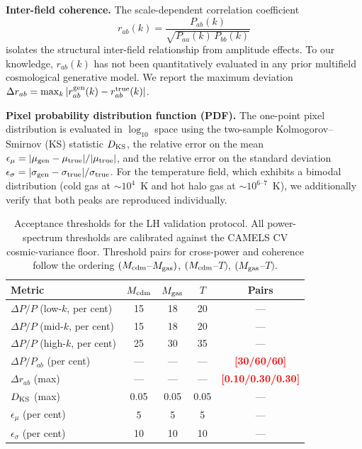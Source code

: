 \documentclass[usenatbib]{mnras}
\newcommand{\FILL}[1]{\textcolor{red}{\textbf{[#1]}}}
\newcommand{\Mcdm}{M_{\rm cdm}}
\newcommand{\Mgas}{M_{\rm gas}}
\newcommand{\Tgas}{T}
\newcommand{\DeltaP}{\Delta P/P}
\begin{document}
\textbf{Inter-field coherence.}
The scale-dependent correlation coefficient
\begin{equation}
  r_{ab}(k) = \frac{P_{ab}(k)}{\sqrt{P_{aa}(k)\,P_{bb}(k)}}
  \label{eq:rab}
\end{equation}
isolates the structural inter-field relationship from amplitude effects.
To our knowledge, $r_{ab}(k)$ has not been quantitatively evaluated in
any prior multifield cosmological generative model.
We report the maximum deviation
$\Delta r_{ab} = \max_k |r_{ab}^{\rm gen}(k) - r_{ab}^{\rm true}(k)|$.

\textbf{Pixel probability distribution function (PDF).}
The one-point pixel distribution is evaluated in $\log_{10}$ space using
the two-sample Kolmogorov--Smirnov (KS) statistic $D_{\rm KS}$, the
relative error on the mean
$\epsilon_\mu = |\mu_{\rm gen} - \mu_{\rm true}|/|\mu_{\rm true}|$, and
the relative error on the standard deviation
$\epsilon_\sigma = |\sigma_{\rm gen} - \sigma_{\rm true}|/
\sigma_{\rm true}$.
For the temperature field, which exhibits a bimodal distribution (cold
gas at $\sim10^4$~K and hot halo gas at
$\sim10^{6\text{--}7}$~K), we additionally verify that both peaks are
reproduced individually.

\begin{table}
  \centering
  \begin{tabular}{lcccc}
    \hline
    Metric & $\Mcdm$ & $\Mgas$ & $\Tgas$ & Pairs \\
    \hline
    $\DeltaP$ (low-$k$, per cent)  & 15 & 18 & 20 & --- \\
    $\DeltaP$ (mid-$k$, per cent)  & 15 & 18 & 20 & --- \\
    $\DeltaP$ (high-$k$, per cent) & 25 & 30 & 35 & --- \\
    $\DeltaP_{ab}$ (per cent)      & --- & --- & --- & \FILL{30/60/60} \\
    $\Delta r_{ab}$ (max)          & --- & --- & --- & \FILL{0.10/0.30/0.30} \\
    $D_{\rm KS}$ (max)             & 0.05 & 0.05 & 0.05 & --- \\
    $\epsilon_\mu$ (per cent)      & 5 & 5 & 5 & --- \\
    $\epsilon_\sigma$ (per cent)   & 10 & 10 & 10 & --- \\
    \hline
  \end{tabular}
  \caption{Acceptance thresholds for the LH validation protocol.
    All power-spectrum thresholds are calibrated against the CAMELS CV
    cosmic-variance floor.
    Threshold pairs for cross-power and coherence follow the ordering
    $(\Mcdm$--$\Mgas)$, $(\Mcdm$--$\Tgas)$, $(\Mgas$--$\Tgas)$.}
  \label{tab:thresholds}
\end{table}
\end{document}
